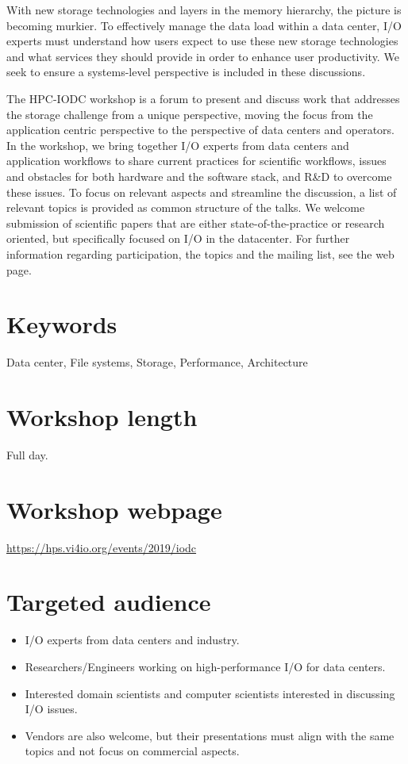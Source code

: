 \documentclass[a4paper,10pt]{article}
\begin{document}
With new storage technologies and layers in the memory hierarchy, the picture is becoming murkier.
To effectively manage the data load within a data center, I/O experts must understand how users expect to use these new storage technologies and what services they should provide in order to enhance user productivity. We seek to ensure a systems-level perspective is included in these discussions.

The HPC-IODC workshop is a forum to present and discuss work that addresses the storage challenge from a unique perspective, moving the focus from the application centric perspective to the perspective of data centers and operators.
In the workshop, we bring together I/O experts from data centers and application workflows to share current practices for scientific workflows, issues and obstacles for both hardware and the software stack, and R\&D to overcome these issues.
To focus on relevant aspects and streamline the discussion, a list of relevant topics is provided as common structure of the talks.
We welcome submission of scientific papers that are either state-of-the-practice or research oriented, but specifically focused on I/O in the datacenter.
For further information regarding participation, the topics and the mailing list, see the web page.

\section{Keywords}
Data center, File systems, Storage, Performance, Architecture

\section{Workshop length}
Full day.

\section{Workshop webpage}
\url{https://hps.vi4io.org/events/2019/iodc}


\section{Targeted audience}
\begin{itemize}
\item I/O experts from data centers and industry.
\item Researchers/Engineers working on high-performance I/O for data centers.
\item Interested domain scientists and computer scientists interested in discussing I/O issues.
\item Vendors are also welcome, but their presentations must align with the same topics and not focus on commercial aspects.
\end{itemize}
\end{document}
